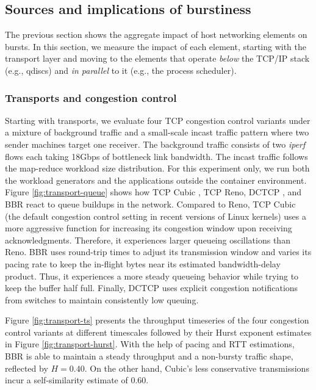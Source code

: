 \subsection{Sources and implications of burstiness}
\label{sec:sources}
The previous section shows the aggregate impact of host networking elements on bursts. In this section, we measure the impact of each element, starting with the transport layer and moving to the elements that operate \emph{below} the TCP/IP stack (e.g., qdiscs) and \emph{in parallel} to it (e.g., the process scheduler).




\subsubsection{Transports and congestion control}
Starting with transports, we evaluate four TCP congestion control variants under a mixture of background traffic and a small-scale incast traffic pattern where two sender machines target one receiver. The background traffic consists of two \textit{iperf} flows each taking 18Gbps of bottleneck link bandwidth. The incast traffic follows the map-reduce workload size distribution. For this experiment only, we run both the workload generators and the applications outside the container environment. Figure \ref{fig:transport-queue} shows how TCP Cubic \cite{cubic}, TCP Reno, DCTCP \cite{dctcp}, and BBR \cite{bbr} react to queue buildups in the network. 
Compared to Reno, TCP Cubic (the default congestion control setting in recent versions of Linux kernels) uses a more aggressive function for increasing its congestion window upon receiving acknowledgments. Therefore, it experiences larger queueing oscillations than Reno. BBR uses round-trip times to adjust its transmission window and varies its pacing rate to keep the in-flight bytes near its estimated bandwidth-delay product. Thus, it experiences a more steady queueing behavior while trying to keep the buffer half full. Finally, DCTCP uses explicit congestion notifications from switches to maintain consistently low queuing.

Figure \ref{fig:transport-ts} presents the throughput timeseries of the four congestion control variants at different timescales followed by their Hurst exponent estimates in Figure \ref{fig:transport-hurst}.
With the help of pacing and RTT estimations, BBR is able to maintain a steady throughput and a non-bursty traffic shape, reflected by $H = 0.40$.
On the other hand, Cubic's less conservative transmissions incur a self-similarity estimate of 0.60.

